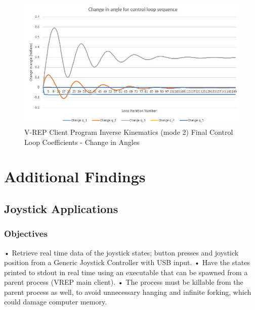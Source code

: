 \documentclass[12pt,openany,a4paper]{book}
\begin{document}
\begin{center}
\begin{figure}[htb]
  \includegraphics[width=1\linewidth]{control_loop_angles.jpg}
\caption{ V-REP Client Program Inverse Kinematics (mode 2) Final Control Loop Coefficients - Change in Angles }
\end{figure}
\end{center}

\cleardoublepage

\chapter{Additional Findings}

\section{Joystick Applications}
\subsection{Objectives}
•	Retrieve real time data of the joystick states; button presses and joystick position from a Generic Joystick Controller with USB input.
•	Have the states printed to stdout in real time using an executable that can be spawned from a parent process (VREP main client).
•	The process must be killable from the parent process as well, to avoid unnecessary hanging and infinite forking, which could damage computer memory.
\end{document}
